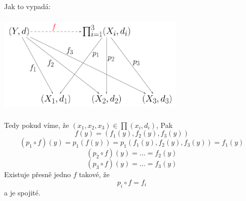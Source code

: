 \documentclass[../main.tex]{subfiles}
\begin{document}
\begin{intuition}
	Jak to vypadá:
	\begin{center}
	\includegraphics[width=9cm,height=4.8cm]{ipkm.png}
	\end{center}
	Tedy pokud víme, že $(x_1,x_2,x_3)\in \prod (x_i,d_i)$, Pak
	\[f(y) = (f_1(y),f_2(y),f_3(y))\]
	\[(p_1\circ f)(y) = p_1(f(y)) = p_1(f_1(y),f_2(y),f_3(y))=f_1(y)\]
	\[(p_2\circ f)(y) = ... = f_2(y)\]
	\[(p_3\circ f)(y) = ... = f_3(y)\]
	Existuje přesně jedno $f$ takové, že 
	\[p_i \circ f = f_i\]
	a je spojité.
\end{intuition}
\end{document}
